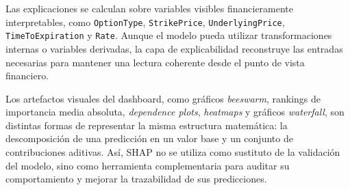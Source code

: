 Las explicaciones se calculan sobre variables visibles financieramente interpretables, como \texttt{OptionType}, \texttt{StrikePrice}, \texttt{UnderlyingPrice}, \texttt{TimeToExpiration} y \texttt{Rate}. Aunque el modelo pueda utilizar transformaciones internas o variables derivadas, la capa de explicabilidad reconstruye las entradas necesarias para mantener una lectura coherente desde el punto de vista financiero.

Los artefactos visuales del dashboard, como gráficos \emph{beeswarm}, rankings de importancia media absoluta, \emph{dependence plots}, \emph{heatmaps} y gráficos \emph{waterfall}, son distintas formas de representar la misma estructura matemática: la descomposición de una predicción en un valor base y un conjunto de contribuciones aditivas. Así, SHAP no se utiliza como sustituto de la validación del modelo, sino como herramienta complementaria para auditar su comportamiento y mejorar la trazabilidad de sus predicciones.

